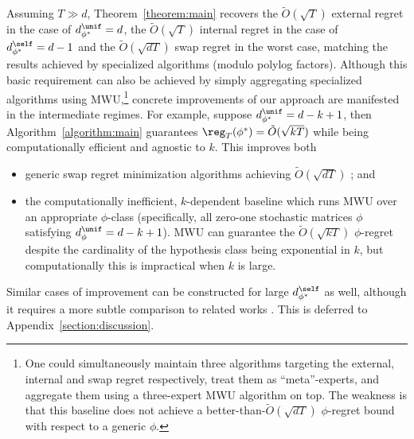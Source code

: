 \documentclass[10pt]{article}
\begin{document}
Assuming $T\gg d$, Theorem~\ref{theorem:main} recovers the $\tilde O(\sqrt{T})$ external regret in the case of $d^\unif_{\phi^*}=d$, the $\tilde O(\sqrt{T})$ internal regret in the case of $d^\self_{\phi^*}=d-1$ and the $\tilde O(\sqrt{dT})$ swap regret in the worst case, matching the results achieved by specialized algorithms (modulo polylog factors). Although this basic requirement can also be achieved by simply aggregating specialized algorithms using MWU,\footnote{One could simultaneously maintain three algorithms targeting the external, internal and swap regret respectively, treat them as ``meta''-experts, and aggregate them using a three-expert MWU algorithm on top. The weakness is that this baseline does not achieve a better-than-$\tilde O(\sqrt{dT})$ $\phi$-regret bound with respect to a generic $\phi$.} concrete improvements of our approach are 
manifested in the intermediate regimes. For example, suppose $d^\unif_{\phi^*}=d-k+1$, then Algorithm~\ref{algorithm:main} guarantees $\reg_T(\phi^*)=\tilde O(\sqrt{kT})$ while being computationally efficient and agnostic to $k$. This improves both
\begin{itemize}
\item generic swap regret minimization algorithms achieving $\tilde O(\sqrt{dT})$ \citep{blum2007external}; and
\item the computationally inefficient, $k$-dependent baseline which runs MWU over an appropriate $\phi$-class (specifically, all zero-one stochastic matrices $\phi$ satisfying $d^\unif_{\phi}=d-k+1$). MWU can guarantee the $\tilde O(\sqrt{kT})$ $\phi$-regret despite the cardinality of the hypothesis class being exponential in $k$, but computationally this is impractical when $k$ is large. 
\end{itemize}
Similar cases of improvement can be constructed for large $d^\self_{\phi^*}$ as well, although it requires a more subtle comparison to related works \citep{roth2023learning,noarov2023high}. This is deferred to Appendix~\ref{section:discussion}. 
\end{document}
